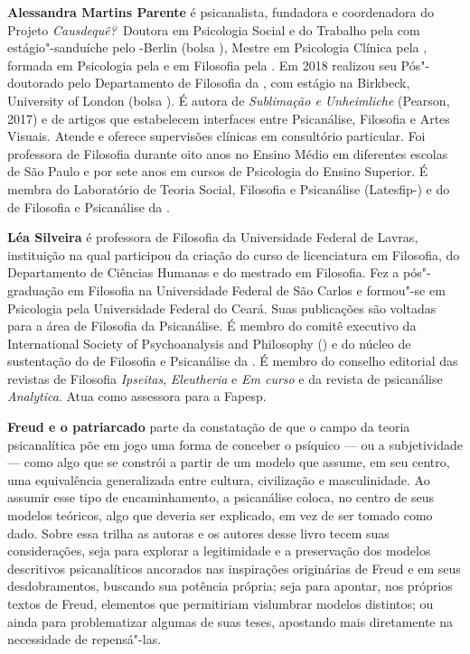 \textbf{Alessandra Martins Parente} é psicanalista, fundadora e coordenadora do
Projeto \emph{Causdequê?} Doutora em Psicologia Social e do Trabalho pela  com
estágio"-sanduíche pelo -Berlin (bolsa ), Mestre em Psicologia Clínica pela
, formada em Psicologia pela  e em Filosofia pela . Em 2018 realizou seu Pós"-doutorado pelo Departamento de Filosofia da , com estágio na
Birkbeck, University of London (bolsa ). É autora de
\emph{Sublimação e Unheimliche} (Pearson, 2017) e de artigos que estabelecem interfaces entre
Psicanálise, Filosofia e Artes Visuais. Atende e oferece supervisões clínicas em
consultório particular. Foi professora de Filosofia durante oito anos no Ensino Médio
em diferentes escolas de São Paulo e por sete anos em cursos de Psicologia do Ensino
Superior. É membra do Laboratório de Teoria Social, Filosofia e Psicanálise (Latesfip-) e do  de Filosofia e Psicanálise da .

\textbf{Léa Silveira} é professora de Filosofia da Universidade Federal de Lavras, instituição na
qual participou da criação do curso de licenciatura em Filosofia, do Departamento de
Ciências Humanas e do mestrado em Filosofia. Fez a pós"-graduação em Filosofia na
Universidade Federal de São Carlos e formou"-se em Psicologia pela Universidade
Federal do Ceará. Suas publicações são voltadas para a área de Filosofia da Psicanálise.
É membro do comitê executivo da International Society of Psychoanalysis and
Philosophy () e do núcleo de sustentação do  de Filosofia e Psicanálise da . É membro do conselho editorial das revistas de Filosofia \emph{Ipseitas}, \emph{Eleutheria} e \emph{Em curso} e da revista de psicanálise \emph{Analytica}. Atua como assessora para a Fapesp.

\textbf{Freud e o patriarcado} parte da constatação de que o campo da teoria psicanalítica põe em jogo uma forma de conceber o psíquico --- ou a subjetividade --- como algo que se constrói a partir de um modelo que assume, em seu centro, uma equivalência generalizada entre cultura, civilização e masculinidade. Ao assumir esse tipo de encaminhamento, a psicanálise coloca, no centro de seus modelos teóricos, algo que deveria ser explicado, em vez de ser tomado como dado. Sobre essa trilha as autoras e os autores desse livro tecem suas considerações, seja para explorar a legitimidade e a preservação dos modelos descritivos psicanalíticos ancorados nas inspirações originárias de Freud e em seus desdobramentos, buscando sua potência própria; seja para apontar, nos próprios textos de Freud, elementos que permitiriam vislumbrar modelos distintos; ou ainda para problematizar algumas de suas teses, apostando mais diretamente na necessidade de repensá"-las. 







